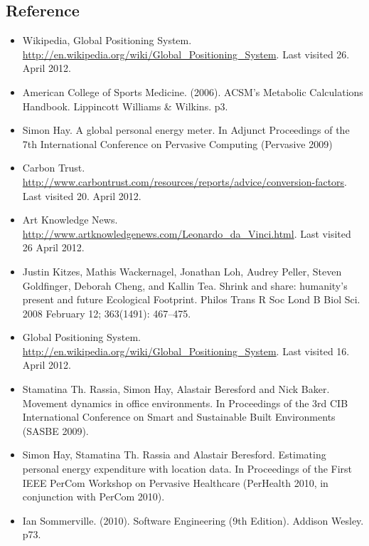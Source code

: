 \documentclass[12pt, a4paper]{report}   %
\begin{document}
\begin{enumerate}
\begin{thebibliography}{9}
\subsection*{Reference}

\begin{itemize}
	\item [1] Wikipedia, Global Positioning System. \url{http://en.wikipedia.org/wiki/Global_Positioning_System}. Last visited 26. April 2012.\\
	\item [2] American College of Sports Medicine. (2006). ACSM's Metabolic Calculations Handbook. Lippincott Williams \& Wilkins. p3.\\
	\item [3] Simon Hay. A global personal energy meter. In Adjunct Proceedings of the 7th International Conference on Pervasive Computing (Pervasive 2009)\\
	\item [4] Carbon Trust. \url{http://www.carbontrust.com/resources/reports/advice/conversion-factors}. Last visited 20. April 2012.\\
	\item [5] Art Knowledge News. \url{http://www.artknowledgenews.com/Leonardo_da_Vinci.html}. Last visited 26 April 2012.\\
	\item [6] Justin Kitzes, Mathis Wackernagel, Jonathan Loh, Audrey Peller, Steven Goldfinger, Deborah Cheng, and Kallin Tea. Shrink and share: humanity's present and future Ecological Footprint. Philos Trans R Soc Lond B Biol Sci. 2008 February 12; 363(1491): 467–475.\\
	\item [7] Global Positioning System. \url{http://en.wikipedia.org/wiki/Global_Positioning_System}. Last visited 16. April 2012.\\
	\item [8] Stamatina Th. Rassia, Simon Hay, Alastair Beresford and Nick Baker. Movement dynamics in office environments. In Proceedings of the 3rd CIB International Conference on Smart and Sustainable Built Environments (SASBE 2009).\\
	\item [9] Simon Hay, Stamatina Th. Rassia and Alastair Beresford. Estimating personal energy expenditure with location data. In Proceedings of the First IEEE PerCom Workshop on Pervasive Healthcare (PerHealth 2010, in conjunction with PerCom 2010).\\
	\item [10] Ian Sommerville. (2010). Software Engineering (9th Edition). Addison Wesley. p73.\\

\end{itemize}
\end{thebibliography}
\end{enumerate}
\end{document}
